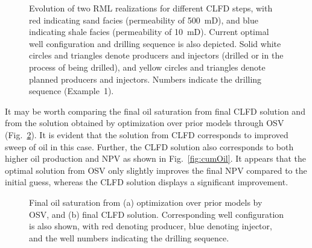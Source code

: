 \documentclass[11pt]{article}
\begin{document}
\begin{figure}
\centering
%
\caption{Evolution of two RML realizations for different CLFD steps, with red indicating sand facies (permeability of 500~mD),
and blue indicating shale facies (permeability of 10~mD).
Current optimal well configuration and drilling sequence is also depicted. Solid white circles
and triangles denote producers and injectors (drilled or in the process of being drilled),
and yellow circles and triangles denote planned producers and injectors. Numbers indicate the drilling sequence (Example~1).
}
\label{fig:evol-OSV-OPCA}
\end{figure}


It may be worth comparing the final oil saturation from final CLFD solution and from the solution obtained by optimization
over prior models through OSV (Fig.~\ref{fig:oilsat}). It is evident that the solution from CLFD corresponds to improved sweep of oil in this case.
Further, the CLFD solution also corresponds to both higher oil production and NPV as shown in Fig.~\ref{fig:cumOil}.
It appears that the optimal solution from OSV only slightly improves the final NPV compared to the initial guess,
whereas the CLFD solution displays a significant improvement.

\begin{figure}
\centering
\caption{Final oil saturation from (a) optimization over prior models by OSV, and (b) final CLFD solution.
Corresponding well configuration is also shown, with red denoting producer, blue denoting injector, and the well numbers indicating the drilling sequence. }
\label{fig:oilsat}
\end{figure}
\end{document}
